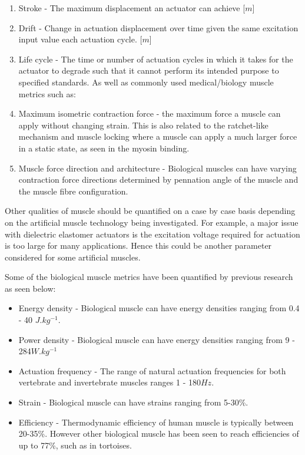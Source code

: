 \begin{enumerate}
    \item Stroke - The maximum displacement an actuator can achieve [$m$]
    \item Drift - Change in actuation displacement over time given the same excitation input value each actuation cycle. [$m$] \nocite{Hussain2019}
    \item Life cycle - The time or number of actuation cycles in which it takes for the actuator to degrade such that it cannot perform its intended purpose to specified standards.
\newline
\newline
    As well as commonly used medical/biology muscle metrics such as:
\newline
    \item Maximum isometric contraction force - the maximum force a muscle can apply without changing strain. This is also related to the ratchet-like mechanism and muscle locking where a muscle can apply a much larger force in a static state, as seen in the myosin binding\citep{Cross2006}.
    \item Muscle force direction and architecture - Biological muscles can have varying contraction force directions determined by pennation angle of the muscle and the muscle fibre configuration.
\end{enumerate}
Other qualities of muscle should be quantified on a case by case basis depending on the artificial muscle technology being investigated. For example, a major issue with dielectric elastomer actuators is the excitation voltage required for actuation is too large for many applications. Hence this could be another parameter considered for some artificial muscles.

Some of the biological muscle metrics have been quantified by previous research as seen below:
\begin{itemize}
    \item Energy density - Biological muscle can have energy densities ranging from 0.4 - 40 $J.kg^{-1}$\citep{Alexander1977}.
    \item Power density - Biological muscle can have energy densities ranging from 9 - 284$W.kg^{-1}$\citep{Full2004}
    \item Actuation frequency - The range of natural actuation frequencies for both vertebrate and invertebrate muscles ranges 1 - 180$Hz$\citep{Full2004}.
    \item Strain - Biological muscle can have strains ranging from 5-30\%\citep{Duduta2019}.
    \item Efficiency - Thermodynamic efficiency of human muscle is typically between 20-35\%\citep{Smith2005}. However other biological muscle has been seen to reach efficiencies of up to 77\%, such as in tortoises\citep{Smith2005}.
\end{itemize}
    

